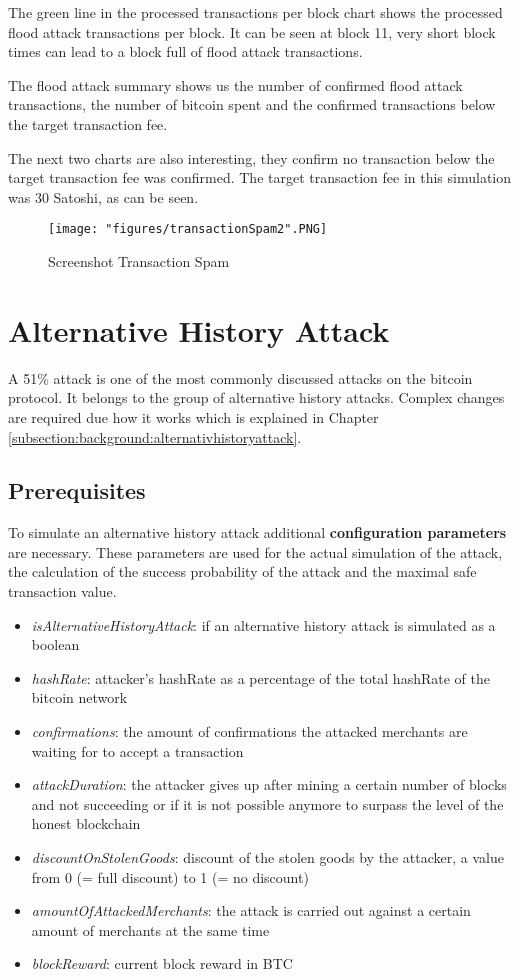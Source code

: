 The green line in the processed transactions per block chart shows the processed flood attack transactions per block. It can be seen at block 11, very short block times can lead to a block full of flood attack transactions.

The flood attack summary shows us the number of confirmed flood attack transactions, the number of bitcoin spent and the confirmed transactions below the target transaction fee.

The next two charts are also interesting, they confirm no transaction below the target transaction fee was confirmed. The target transaction fee in this simulation was 30 Satoshi, as can be seen.

\begin{figure}[p]
\centering
\texttt{[image: "figures/transactionSpam2".PNG]}
\caption{Screenshot Transaction Spam
\label{fig:TransactionSpam}}
\end{figure}

\section{Alternative History Attack}
A 51\% attack is one of the most commonly discussed attacks on the bitcoin protocol. It belongs to the group of alternative history attacks. Complex changes are required due how it works which is explained in Chapter \ref{subsection:background:alternativhistoryattack}.

\subsection{Prerequisites\label{prerequisites}}

To simulate an alternative history attack additional \textbf{configuration parameters} are necessary. These parameters are used for the actual simulation of the attack, the calculation of the success probability of the attack and the maximal safe transaction value.

\begin{itemize}
\item \textit{isAlternativeHistoryAttack}: if an alternative history attack is simulated as a boolean
\item \textit{hashRate}: attacker's hashRate as a percentage of the total hashRate of the bitcoin network
\item \textit{confirmations}: the amount of confirmations the attacked merchants are waiting for to accept a transaction
\item \textit{attackDuration}: the attacker gives up after mining a certain number of blocks and not succeeding or if it is not possible anymore to surpass the level of the honest blockchain
\item \textit{discountOnStolenGoods}: discount of the stolen goods by the attacker, a value from 0 (= full discount) to 1 (= no discount)
\item \textit{amountOfAttackedMerchants}: the attack is carried out against a certain amount of merchants at the same time
\item \textit{blockReward}: current block reward in BTC
\end{itemize}


